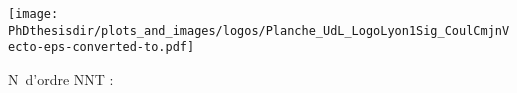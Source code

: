 \thispagestyle{empty}
\begin{center}
\large

\texttt{[image: \\PhDthesisdir/plots\_and\_images/logos/Planche\_UdL\_LogoLyon1Sig\_CoulCmjnVecto-eps-converted-to.pdf]}

\begin{flushleft}
N\degree\ d'ordre NNT : \NordreNNT
\end{flushleft}
\vspace{\baselineskip}



\vfill

\end{center}
